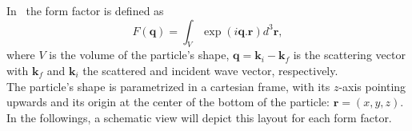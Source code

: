 

In \BornAgain\ the form factor is defined as
\begin{equation}
F(\mathbf{q})=\int_V \exp (i\mathbf{q}.\mathbf{r}) d^3 \mathbf{r},
\label{ffformulaBA}
\end{equation}
where $V$ is the volume of the particle's shape,
$\mathbf{q}=\mathbf{k}_i - \mathbf{k}_f$ is the scattering vector with
$\mathbf{k}_f$ and $\mathbf{k}_i$ the scattered and incident wave
vector, respectively.\\

The particle's shape is parametrized in a cartesian frame, with its
$z$-axis pointing upwards and its origin at the center of the bottom
of the particle: $\mathbf{r}=(x,y,z)$. In the followings, a schematic view will depict this layout for each
form factor.\\


